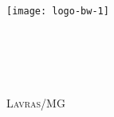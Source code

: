 
\begin{comment}
\begin{titlepage}
\maketitle
\end{titlepage} 
\end{comment}


\newpage

\begin{titlepage}
\begin{center}
\textsc{\LARGE \ImprimirEdition}\\[2.0cm]
\texttt{[image: logo-bw-1]}\\[2.0cm]
\HRule{0.4cm} \\[0.4cm]
{ \fontsize{40}{60}   \bfseries \MakeUppercase{\mytitle}}\\[0.4cm]
\HRule{0.4cm} \\[0.7cm]
{\fontsize{25}{30} \textsc{\mysubtitle}}\\[0.5cm]
\vfill
{\fontsize{20}{0} \textsc{\myauthor} }\\%

\vfill
{\fontsize{20}{0} \textsc{Lavras/MG}}\\[0.4cm]
{\fontsize{20}{0} \textsc{\imprimiryear}}
\end{center}
\end{titlepage}

